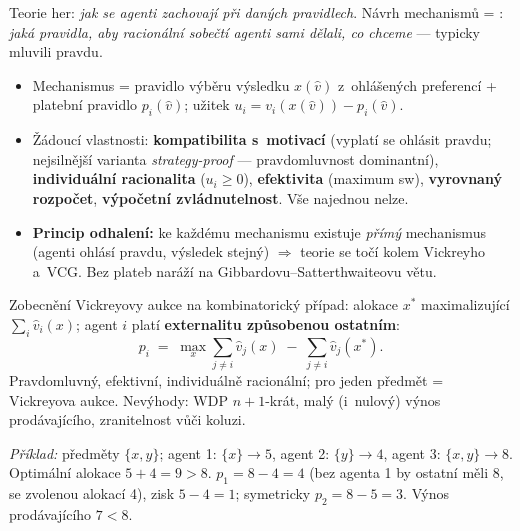 \documentclass[11pt,a4paper]{article}
\theoremstyle{definition}
\begin{document}
\begin{defbox}
Teorie her: \emph{jak se agenti zachovají při daných pravidlech}. Návrh mechanismů =
: \emph{jaká pravidla, aby racionální sobečtí agenti sami dělali, co
chceme} --- typicky mluvili pravdu.
\begin{itemize}
\item Mechanismus = pravidlo výběru výsledku $x(\hat v)$ z~ohlášených preferencí + platební
  pravidlo $p_i(\hat v)$; užitek $u_i = v_i(x(\hat v)) - p_i(\hat v)$.
\item Žádoucí vlastnosti: \textbf{kompatibilita s~motivací} (vyplatí se ohlásit pravdu;
  nejsilnější varianta \emph{strategy-proof} --- pravdomluvnost dominantní),
  \textbf{individuální racionalita} ($u_i \ge 0$), \textbf{efektivita} (maximum sw),
  \textbf{vyrovnaný rozpočet}, \textbf{výpočetní zvládnutelnost}. Vše najednou nelze.
\item \textbf{Princip odhalení:} ke každému mechanismu existuje \emph{přímý} mechanismus
  (agenti ohlásí pravdu, výsledek stejný) $\Rightarrow$ teorie se točí kolem Vickreyho a~VCG.
  Bez plateb naráží na Gibbardovu--Satterthwaiteovu větu.
\end{itemize}
\end{defbox}

\begin{defbox}
Zobecnění Vickreyovy aukce na kombinatorický případ: alokace $x^*$ maximalizující
$\sum_i \hat v_i(x)$; agent $i$ platí \textbf{externalitu způsobenou ostatním}:
\[
p_i \;=\; \max_{x} \sum_{j \ne i} \hat v_j(x) \;-\; \sum_{j \ne i} \hat v_j(x^*) .
\]
Pravdomluvný, efektivní, individuálně racionální; pro jeden předmět = Vickreyova aukce.
Nevýhody: WDP $n{+}1$-krát, malý (i~nulový) výnos prodávajícího, zranitelnost vůči koluzi.

\emph{Příklad:} předměty $\{x,y\}$; agent 1: $\{x\}\to5$, agent 2: $\{y\}\to4$, agent 3:
$\{x,y\}\to8$. Optimální alokace $5+4=9 > 8$. $p_1 = 8 - 4 = 4$ (bez agenta 1 by ostatní měli 8,
se zvolenou alokací 4), zisk $5-4=1$; symetricky $p_2 = 8-5 = 3$. Výnos prodávajícího $7 < 8$.
\end{defbox}
\end{document}
